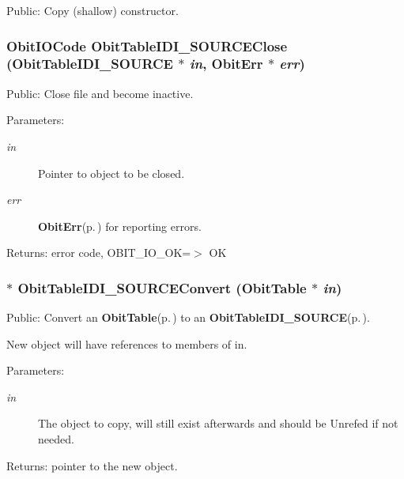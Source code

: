 Public: Copy (shallow) constructor. 

\subsubsection{\setlength{\rightskip}{0pt plus 5cm}Obit\-IOCode Obit\-Table\-IDI\_\-SOURCEClose ({\bf Obit\-Table\-IDI\_\-SOURCE} $\ast$ {\em in}, {\bf Obit\-Err} $\ast$ {\em err})}\label{ObitTableIDI__SOURCE_8h_a21}


Public: Close file and become inactive. 

\begin{Desc}
\item[Parameters:]
\begin{description}
\item[{\em in}]Pointer to object to be closed. \item[{\em err}]{\bf Obit\-Err}{\rm (p.\,\pageref{structObitErr})} for reporting errors. \end{description}
\end{Desc}
\begin{Desc}
\item[Returns:]error code, OBIT\_\-IO\_\-OK=$>$ OK \end{Desc}
\subsubsection{$\ast$ Obit\-Table\-IDI\_\-SOURCEConvert ({\bf Obit\-Table} $\ast$ {\em in})}\label{ObitTableIDI__SOURCE_8h_a16}


Public: Convert an {\bf Obit\-Table}{\rm (p.\,\pageref{structObitTable})} to an {\bf Obit\-Table\-IDI\_\-SOURCE}{\rm (p.\,\pageref{structObitTableIDI__SOURCE})}. 

New object will have references to members of in. \begin{Desc}
\item[Parameters:]
\begin{description}
\item[{\em in}]The object to copy, will still exist afterwards and should be Unrefed if not needed. \end{description}
\end{Desc}
\begin{Desc}
\item[Returns:]pointer to the new object. \end{Desc}
